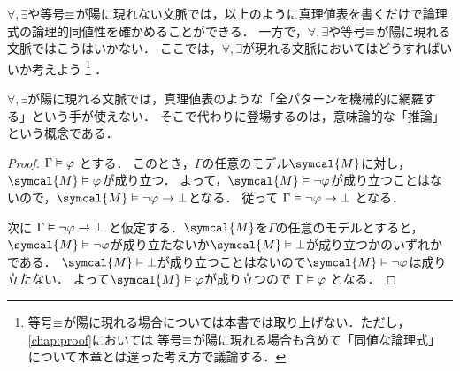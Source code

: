 \(\forall, \exists\)や等号\(\equiv\)が陽に現れない文脈では，以上のように真理値表を書くだけで論理式の論理的同値性を確かめることができる．
一方で，\(\forall, \exists\)や等号\(\equiv\)が陽に現れる文脈ではこうはいかない．
ここでは，\(\forall, \exists\)が現れる文脈においてはどうすればいいか考えよう%
\footnote{%
	等号\(\equiv\)が陽に現れる場合については本書では取り上げない．ただし，\cref{chap:proof}においては
	等号\(\equiv\)が陽に現れる場合も含めて「同値な論理式」について本章とは違った考え方で議論する．
}%
．

\(\forall, \exists\)が陽に現れる文脈では，真理値表のような「全パターンを機械的に網羅する」という手が使えない．
そこで代わりに登場するのは，意味論的な「推論」という概念である．


\begin{proof}
	\(\Gamma \vDash \varphi\)
	とする．
	このとき，\(\Gamma\)の任意のモデル\(\symcal{M}\)に対し，\(\symcal{M} \satisfy \varphi\)が成り立つ．
	よって，\(\symcal{M} \satisfy \lnot \varphi\)が成り立つことはないので，\(\symcal{M} \satisfy \lnot \varphi \to \bot\)となる．
	従って
	\(\Gamma \vDash \lnot \varphi \to \bot\)
	となる．

	次に
	\(\Gamma \vDash \lnot \varphi \to \bot\)
	と仮定する．\(\symcal{M}\)を\(\Gamma\)の任意のモデルとすると，
	\(\symcal{M} \satisfy \lnot \varphi\)が成り立たないか\(\symcal{M} \satisfy \bot\)が成り立つかのいずれかである．
	\(\symcal{M} \satisfy \bot\)が成り立つことはないので\(\symcal{M} \satisfy \lnot \varphi\)は成り立たない．
	よって\(\symcal{M} \satisfy \varphi\)が成り立つので
	\(\Gamma \vDash \varphi\)
	となる．
\end{proof}


